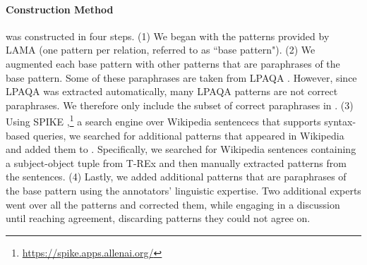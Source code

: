 
\paragraph{Construction Method}
\resource{} was constructed in four steps. (1) We began with
the patterns provided by LAMA \cite{lama} (one pattern per
relation, referred to as ``base pattern"). (2) We augmented
each base pattern with other patterns that are paraphrases of
the base pattern. Some of these paraphrases are taken from
LPAQA \cite{alpaqa}. However, since LPAQA was
extracted automatically, many LPAQA patterns are not
correct paraphrases.
We therefore only include the subset of correct paraphrases in \resource{}.
(3) Using SPIKE
\cite{spike},\footnote{\url{https://spike.apps.allenai.org/}}
a search engine over Wikipedia sentencecs that supports
syntax-based queries, we searched for additional patterns
that appeared in Wikipedia and added them to 
\resource{}. Specifically, we searched for Wikipedia sentences
containing a  subject-object
tuple from T-REx and then manually extracted 
patterns from the  sentences. (4) Lastly, we added
additional patterns that are paraphrases of the base pattern
using the annotators' linguistic expertise.  Two additional
experts went over all the patterns and corrected them, while
engaging in a discussion until reaching  agreement,
discarding patterns they could not agree on.




